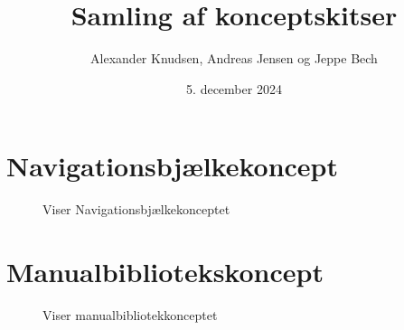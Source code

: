 \documentclass[12pt, a4paper]{article}
\date{5. december 2024}
\title{Samling af konceptskitser}
\author{Alexander Knudsen, Andreas Jensen og Jeppe Bech}
\begin{document}
\maketitle
\section{Navigationsbjælkekoncept}
\begin{figure}[H]
    \centering
    \caption{Viser Navigationsbjælkekonceptet}
\end{figure}

\section{Manualbibliotekskoncept}
\begin{figure}[H]
    \centering
    \caption{Viser manualbibliotekkonceptet}
\end{figure}
\end{document}
